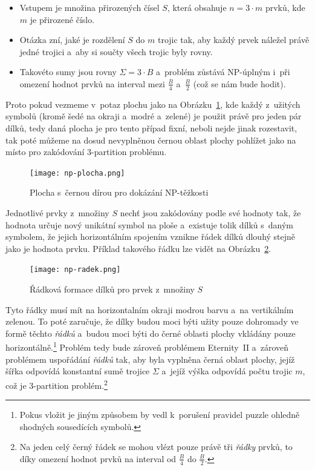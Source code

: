 \documentclass[11pt, titlepage]{report}
\begin{document}
\begin{itemize}
\item Vstupem je množina přirozených čísel $S$, která obsahuje $n = 3 \cdot m$ prvků, kde $m$ je přirozené číslo.
\item Otázka zní, jaké je rozdělení $S$ do $m$ trojic tak, aby každý prvek náležel právě jedné trojici a~aby si součty všech trojic byly rovny.
\item Takovéto sumy jsou rovny $\Sigma = 3 \cdot B$ a~problém zůstává NP-úplným i~při omezení hodnot prvků na interval mezi $\frac{B}{4}$ a~$\frac{B}{2}$ (což se nám bude hodit).
\end{itemize}

Proto pokud vezmeme v~potaz plochu jako na Obrázku~\ref{np-plocha}, kde každý z~užitých symbolů (kromě šedé na okraji a~modré a~zelené) je použit právě pro jeden pár dílků, tedy daná plocha je pro tento případ fixní, neboli nejde jinak rozestavit, tak poté můžeme na dosud nevyplněnou černou oblast plochy pohlížet jako na místo pro zakódování 3-partition problému.

\begin{figure}
\centering
\texttt{[image: np-plocha.png]}
\caption{Plocha s~černou dírou pro dokázání NP-těžkosti}
\label{np-plocha}
\end{figure}

Jednotlivé prvky z~množiny $S$ nechť jsou zakódovány podle své hodnoty tak, že hodnota určuje nový unikátní symbol na ploše a~existuje tolik dílků s~daným symbolem, že jejich horizontálním spojením vznikne řádek dílků dlouhý stejně jako je hodnota prvku. Příklad takového řádku lze vidět na Obrázku~\ref{np-radek}.

\begin{figure}
\centering
\texttt{[image: np-radek.png]}
\caption{Řádková formace dílků pro prvek z~množiny $S$}
\label{np-radek}
\end{figure}

Tyto řádky musí mít na horizontalním okraji modrou barvu a~na vertikálním zelenou. To poté zaručuje, že dílky budou moci býti užity pouze dohromady ve formě těchto \emph{řádků} a~budou moci býti do černé oblasti plochy vkládány pouze horizontálně.\footnote{Pokus vložit je jiným způsobem by vedl k~porušení pravidel puzzle ohledně shodných sousedících symbolů.} Problém tedy bude zároveň problémem Eternity~II a~zároveň problémem uspořádání \emph{řádků} tak, aby byla vyplněna černá oblast plochy, jejíž šířka odpovídá konstantní sumě trojice $\Sigma$ a~jejíž výška odpovídá počtu trojic $m$, což je 3-partition problém.\footnote{Na jeden celý černý řádek se mohou vlézt pouze právě tři \emph{řádky} prvků, to díky omezení hodnot prvků na interval od $\frac{B}{4}$ do $\frac{B}{2}$.}
\end{document}
